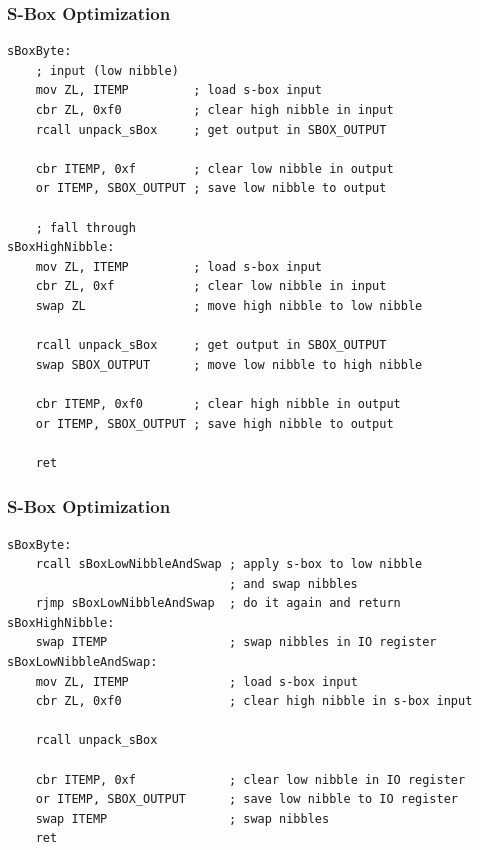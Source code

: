 \documentclass{beamer}
\begin{document}
\begin{frame}[fragile]
\frametitle{S-Box Optimization}
\begin{lstlisting}
sBoxByte:
    ; input (low nibble)
    mov ZL, ITEMP         ; load s-box input
    cbr ZL, 0xf0          ; clear high nibble in input
    rcall unpack_sBox     ; get output in SBOX_OUTPUT

    cbr ITEMP, 0xf        ; clear low nibble in output
    or ITEMP, SBOX_OUTPUT ; save low nibble to output

    ; fall through
sBoxHighNibble:
    mov ZL, ITEMP         ; load s-box input
    cbr ZL, 0xf           ; clear low nibble in input
    swap ZL               ; move high nibble to low nibble

    rcall unpack_sBox     ; get output in SBOX_OUTPUT
    swap SBOX_OUTPUT      ; move low nibble to high nibble

    cbr ITEMP, 0xf0       ; clear high nibble in output
    or ITEMP, SBOX_OUTPUT ; save high nibble to output

    ret
\end{lstlisting}
\end{frame}

\begin{frame}[fragile]
\frametitle{S-Box Optimization}
\begin{lstlisting}
sBoxByte:
    rcall sBoxLowNibbleAndSwap ; apply s-box to low nibble
                               ; and swap nibbles
    rjmp sBoxLowNibbleAndSwap  ; do it again and return
sBoxHighNibble:
    swap ITEMP                 ; swap nibbles in IO register
sBoxLowNibbleAndSwap:
    mov ZL, ITEMP              ; load s-box input
    cbr ZL, 0xf0               ; clear high nibble in s-box input

    rcall unpack_sBox

    cbr ITEMP, 0xf             ; clear low nibble in IO register
    or ITEMP, SBOX_OUTPUT      ; save low nibble to IO register
    swap ITEMP                 ; swap nibbles
    ret
\end{lstlisting}
\end{frame}
\end{document}

